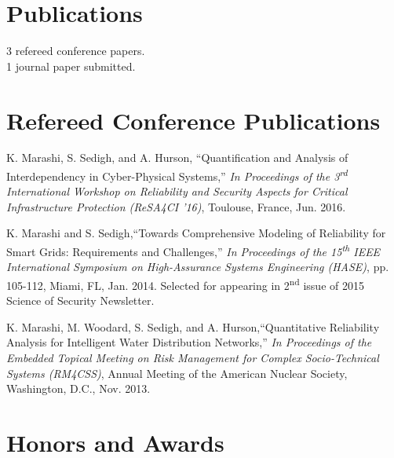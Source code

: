 \documentclass[10pt]{article}
\newlength{\Vspace}
\newlength{\Vspace}
\newlength{\VspacePub}
\begin{document}
\ifResume
\section{Publications}

\begin{flushleft}
3 refereed conference papers. \\
1 journal paper submitted.
\end{flushleft}

\else
\section{Refereed Conference Publications}

\begin{flushleft}
K. Marashi, S. Sedigh, and A. Hurson, ``Quantification and Analysis of Interdependency in Cyber-Physical Systems,'' \textit{In Proceedings of the 3\textsuperscript{rd} International Workshop on Reliability and Security Aspects for Critical Infrastructure Protection (ReSA4CI '16)}, Toulouse, France, Jun. 2016. \\ \vspace{\VspacePub}

K. Marashi and S. Sedigh,``Towards Comprehensive Modeling of Reliability for Smart Grids: Requirements and Challenges,''
\textit{In Proceedings of the 15\textsuperscript{th} IEEE International Symposium on High-Assurance Systems Engineering (HASE)}, pp. 105-112, Miami, FL, Jan. 2014. Selected for appearing in 2\textsuperscript{nd} issue of 2015 Science of Security Newsletter. \\ \vspace{\VspacePub}

K. Marashi, M. Woodard, S. Sedigh, and A. Hurson,``Quantitative Reliability Analysis for Intelligent Water Distribution Networks,'' \textit{In Proceedings of the Embedded Topical Meeting on Risk Management for Complex Socio-Technical Systems (RM4CSS)}, Annual Meeting of the American Nuclear Society, Washington, D.C., Nov. 2013.

\end{flushleft}
\fi

\section{Honors and Awards}
\end{document}
